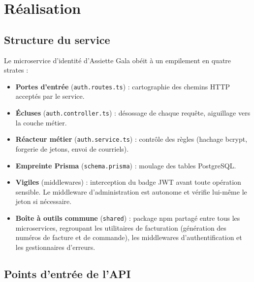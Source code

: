 \section{Réalisation}

\subsection{Structure du service}

Le microservice d'identité d'Assiette Gala obéit à un empilement en quatre strates :

\begin{itemize}
    \item \textbf{Portes d'entrée} (\texttt{auth.routes.ts}) : cartographie des chemins HTTP acceptés par le service.
    \item \textbf{Écluses} (\texttt{auth.controller.ts}) : désossage de chaque requête, aiguillage vers la couche métier.
    \item \textbf{Réacteur métier} (\texttt{auth.service.ts}) : contrôle des règles (hachage bcrypt, forgerie de jetons, envoi de courriels).
    \item \textbf{Empreinte Prisma} (\texttt{schema.prisma}) : moulage des tables PostgreSQL.
    \item \textbf{Vigiles} (middlewares) : interception du badge JWT avant toute opération sensible. Le middleware d'administration est autonome et vérifie lui-même le jeton si nécessaire.
    \item \textbf{Boîte à outils commune} (\texttt{shared}) : package npm partagé entre tous les microservices, regroupant les utilitaires de facturation (génération des numéros de facture et de commande), les middlewares d'authentification et les gestionnaires d'erreurs.
\end{itemize}

\subsection{Points d'entrée de l'API}

